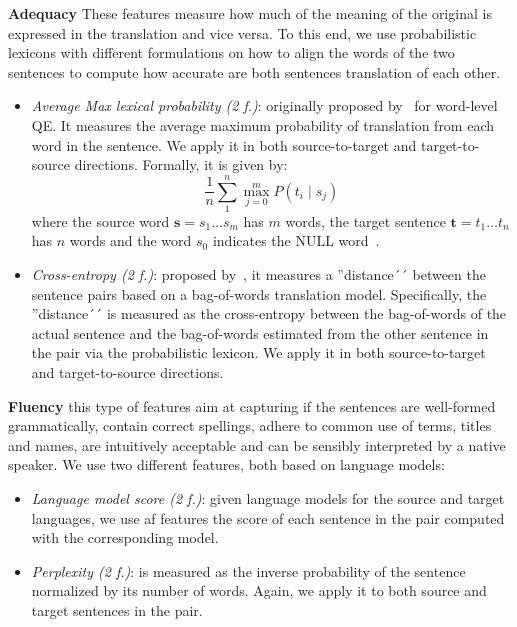 \textbf{Adequacy} These features measure how much of the meaning of the original is expressed in the translation and vice versa. To this end, we use probabilistic lexicons with different formulations on how to align the words of the two sentences to compute how accurate are both sentences translation of each other. 
\begin{itemize}
\item \textit{Average Max lexical probability (2 f.)}: originally proposed by~\cite{Ueffing05} for word-level QE. It measures the average maximum probability of translation from each word in the sentence. We apply it in both source-to-target and target-to-source directions. Formally, it is given by:
$$ \frac{1}{n}\sum_1^n\max_{j=0}^m P(t_i\mid s_j) $$
where the source word $\mathbf{s}=s_1\ldots s_m$ has $m$ words, the target sentence $\mathbf{t}=t_1\ldots t_n$ has $n$ words and the word $s_0$ indicates the NULL word~\cite{Brown93}.
\item \textit{Cross-entropy (2 f.)}: proposed by~\cite{Hainan17}, it measures a ''distance´´ between the sentence pairs based on a bag-of-words translation model. Specifically, the ''distance´´ is measured as the cross-entropy between the bag-of-words of the actual sentence and the bag-of-words estimated from the other sentence in the pair via the probabilistic lexicon. We apply it in both source-to-target and target-to-source directions.
\end{itemize}

\textbf{Fluency} this type of features aim at capturing if the sentences are well-formed grammatically, contain correct spellings, adhere to common use of terms, titles and names, are intuitively acceptable and can be sensibly interpreted by a native speaker. We use two different features, both based on language models:
\begin{itemize}
\item \textit{Language model score (2 f.)}: given language models for the source and target languages, we use af features the score of each sentence in the pair computed with the corresponding model.
\item \textit{Perplexity (2 f.)}: is measured as the inverse probability of the sentence normalized by its number of words. Again, we apply it to both source and target sentences in the pair.
\end{itemize}

